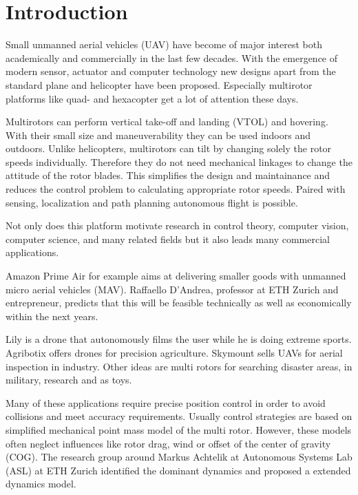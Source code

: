 \chapter{Introduction}
\label{sec:introduction}

 Small unmanned aerial vehicles (UAV) have become of major interest both academically and commercially in the last few decades. With the emergence of modern sensor, actuator and computer technology new designs apart from the standard plane and helicopter have been proposed.  Especially multirotor platforms like quad- and hexacopter get a lot of attention these days.

 Multirotors can perform vertical take-off and landing (VTOL) and hovering. With their small size and maneuverability they can be used indoors and outdoors. Unlike helicopters, multirotors can tilt by changing solely the rotor speeds individually. Therefore they do not need mechanical linkages to change the attitude of the rotor blades. This simplifies the design and maintainance and reduces the control problem to calculating appropriate rotor speeds. Paired with sensing, localization and path planning autonomous flight is possible. 

 Not only does this platform motivate research in control theory, computer vision, computer science, and many related fields but it also leads many commercial applications. 

Amazon Prime Air for example aims at delivering smaller goods with unmanned micro aerial vehicles (MAV). Raffaello D'Andrea, professor at ETH Zurich and entrepreneur, predicts that this will be feasible technically as well as economically within the next years. 

Lily is a drone that autonomously films the user while he is doing extreme sports. Agribotix offers drones for precision agriculture. Skymount sells UAVs for aerial inspection in industry. Other ideas are multi rotors for searching disaster areas, in military, research and as toys.

Many of these applications require precise position control in order to avoid collisions and meet accuracy requirements. Usually control strategies are based on simplified mechanical point mass model of the multi rotor. However, these models often neglect influences like rotor drag, wind or offset of the center of gravity (COG). The research group around Markus Achtelik at Autonomous Systems Lab (ASL) at ETH Zurich identified the dominant dynamics and proposed a extended dynamics model. 

